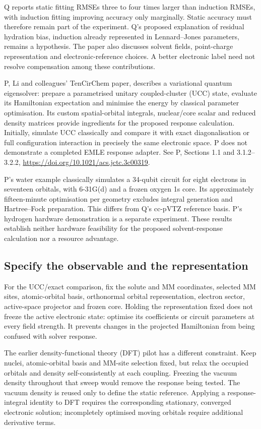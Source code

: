 \documentclass{article}
\begin{document}
Q reports static fitting RMSEs three to four times larger than induction RMSEs, with induction fitting improving accuracy only marginally. Static accuracy must therefore remain part of the experiment. Q's proposed explanation of residual hydration bias, induction already represented in Lennard--Jones parameters, remains a hypothesis. The paper also discusses solvent fields, point-charge representation and electronic-reference choices. A better electronic label need not resolve compensation among these contributions.

P, Li and colleagues' TenCirChem paper, describes a variational quantum eigensolver: prepare a parametrised unitary coupled-cluster (UCC) state, evaluate its Hamiltonian expectation and minimise the energy by classical parameter optimisation. Its custom spatial-orbital integrals, nuclear/core scalar and reduced density matrices provide ingredients for the proposed response calculation. Initially, simulate UCC classically and compare it with exact diagonalisation or full configuration interaction in precisely the same electronic space. P does not demonstrate a completed EMLE response adapter. See P, Sections 1.1 and 3.1.2--3.2.2, \url{https://doi.org/10.1021/acs.jctc.3c00319}.

P's water example classically simulates a 34-qubit circuit for eight electrons in seventeen orbitals, with 6-31G(d) and a frozen oxygen 1s core. Its approximately fifteen-minute optimisation per geometry excludes integral generation and Hartree--Fock preparation. This differs from Q's cc-pVTZ reference basis. P's hydrogen hardware demonstration is a separate experiment. These results establish neither hardware feasibility for the proposed solvent-response calculation nor a resource advantage.

\subsection{Specify the observable and the representation}

For the UCC/exact comparison, fix the solute and MM coordinates, selected MM sites, atomic-orbital basis, orthonormal orbital representation, electron sector, active-space projector and frozen core. Holding the representation fixed does not freeze the active electronic state: optimise its coefficients or circuit parameters at every field strength. It prevents changes in the projected Hamiltonian from being confused with solver response.

The earlier density-functional theory (DFT) pilot has a different constraint. Keep nuclei, atomic-orbital basis and MM-site selection fixed, but relax the occupied orbitals and density self-consistently at each coupling. Freezing the vacuum density throughout that sweep would remove the response being tested. The vacuum density is reused only to define the static reference. Applying a response-integral identity to DFT requires the corresponding stationary, converged electronic solution; incompletely optimised moving orbitals require additional derivative terms.
\end{document}
